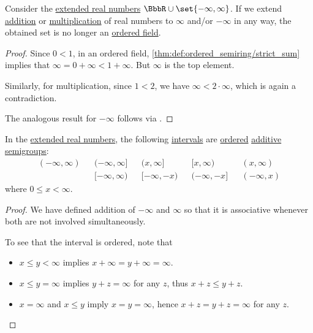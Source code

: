 \begin{proposition}\label{thm:extended_real_numbers_are_not_ordered_field}
  Consider the \hyperref[def:extended_real_numbers]{extended real numbers} \( \BbbR \cup \set{ -\infty, \infty } \). If we extend \hyperref[def:real_number_arithmetic/addition]{addition} or \hyperref[def:real_number_arithmetic/multiplication]{multiplication} of real numbers to \( \infty \) and/or \( -\infty \) in any way, the obtained set is no longer an \hyperref[def:ordered_semiring]{ordered field}.
\end{proposition}
\begin{proof}
  Since \( 0 < 1 \), in an ordered field, \cref{thm:def:ordered_semiring/strict_sum} implies that \( \infty = 0 + \infty < 1 + \infty \). But \( \infty \) is the top element.

  Similarly, for multiplication, since \( 1 < 2 \), we have \( \infty < 2 \cdot \infty \), which is again a contradiction.

  The analogous result for \( -\infty \) follows via .
\end{proof}

\begin{proposition}\label{thm:extended_real_semigroup}
  In the \hyperref[def:extended_real_numbers]{extended real numbers}, the following \hyperref[def:order_interval/closed]{intervals} are \hyperref[def:ordered_semigroup]{ordered} \hyperref[con:additive_semigroup]{additive semigroups}:
  \begin{align*}
    (-\infty, \infty) && (-\infty, \infty] && (x, \infty]   && [x, \infty)    && (x, \infty) \\
                      && [-\infty, \infty) && [-\infty, -x) && (-\infty, -x] && (-\infty, x)
  \end{align*}
  where \( 0 \leq x < \infty \).
\end{proposition}
\begin{proof}
  We have defined addition of \( -\infty \) and \( \infty \) so that it is associative whenever both are not involved simultaneously.

  To see that the interval is ordered, note that
  \begin{itemize}
    \item \( x \leq y < \infty \) implies \( x + \infty = y + \infty = \infty \).
    \item \( x \leq y = \infty \) implies \( y + z = \infty \) for any \( z \), thus \( x + z \leq y + z \).
    \item \( x = \infty \) and \( x \leq y \) imply \( x = y = \infty \), hence \( x + z = y + z = \infty \) for any \( z \).
  \end{itemize}
\end{proof}

